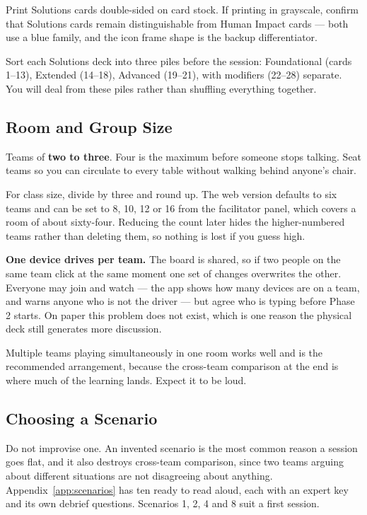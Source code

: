 \documentclass[11pt,letterpaper]{article}
\begin{document}
Print Solutions cards double-sided on card stock. If printing in grayscale,
confirm that Solutions cards remain distinguishable from Human Impact cards ---
both use a blue family, and the icon frame shape is the backup differentiator.

Sort each Solutions deck into three piles before the session: Foundational
(cards 1--13), Extended (14--18), Advanced (19--21), with modifiers (22--28)
separate. You will deal from these piles rather than shuffling everything
together.

\subsection{Room and Group Size}

Teams of \textbf{two to three}. Four is the maximum before someone stops
talking. Seat teams so you can circulate to every table without walking behind
anyone's chair.

For class size, divide by three and round up. The web version defaults to six
teams and can be set to 8, 10, 12 or 16 from the facilitator panel, which covers
a room of about sixty-four. Reducing the count later hides the higher-numbered
teams rather than deleting them, so nothing is lost if you guess high.

\textbf{One device drives per team.} The board is shared, so if two people on the
same team click at the same moment one set of changes overwrites the other.
Everyone may join and watch --- the app shows how many devices are on a team, and
warns anyone who is not the driver --- but agree who is typing before Phase 2
starts. On paper this problem does not exist, which is one reason the physical
deck still generates more discussion.

Multiple teams playing simultaneously in one room works well and is the
recommended arrangement, because the cross-team comparison at the end is where
much of the learning lands. Expect it to be loud.

\subsection{Choosing a Scenario}

Do not improvise one. An invented scenario is the most common reason a session
goes flat, and it also destroys cross-team comparison, since two teams arguing
about different situations are not disagreeing about anything.
Appendix~\ref{app:scenarios} has ten ready to read aloud, each with an expert key
and its own debrief questions. Scenarios 1, 2, 4 and 8 suit a first session.
\end{document}
